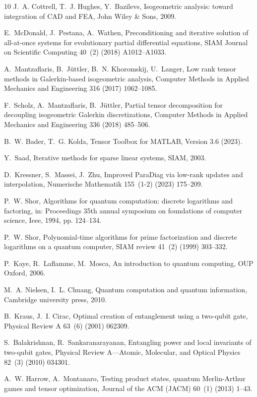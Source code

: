 \documentclass{article}
\numberwithin{equation}{section}
\theoremstyle{definition}
\begin{document}
\begin{thebibliography}{10}
J.~A. Cottrell, T.~J. Hughes, Y.~Bazilevs, {Isogeometric analysis: toward integration of CAD and FEA}, John Wiley \& Sons, 2009.

E.~McDonald, J.~Pestana, A.~Wathen, {Preconditioning and iterative solution of all-at-once systems for evolutionary partial differential equations}, SIAM Journal on Scientific Computing 40~(2) (2018) A1012--A1033.

A.~Mantzaflaris, B.~J{\"u}ttler, B.~N. Khoromskij, U.~Langer, {Low rank tensor methods in Galerkin-based isogeometric analysis}, Computer Methods in Applied Mechanics and Engineering 316 (2017) 1062--1085.

F.~Scholz, A.~Mantzaflaris, B.~J{\"u}ttler, {Partial tensor decomposition for decoupling isogeometric Galerkin discretizations}, Computer Methods in Applied Mechanics and Engineering 336 (2018) 485--506.

B.~W. Bader, T.~G. Kolda, {Tensor Toolbox for MATLAB, Version 3.6} (2023).

Y.~Saad, {Iterative methods for sparse linear systems}, SIAM, 2003.

D.~Kressner, S.~Massei, J.~Zhu, {Improved ParaDiag via low-rank updates and interpolation}, Numerische Mathematik 155~(1-2) (2023) 175--209.

P.~W. Shor, {Algorithms for quantum computation: discrete logarithms and factoring}, in: Proceedings 35th annual symposium on foundations of computer science, Ieee, 1994, pp. 124--134.

P.~W. Shor, {Polynomial-time algorithms for prime factorization and discrete logarithms on a quantum computer}, SIAM review 41~(2) (1999) 303--332.

P.~Kaye, R.~Laflamme, M.~Mosca, {An introduction to quantum computing}, OUP Oxford, 2006.

M.~A. Nielsen, I.~L. Chuang, {Quantum computation and quantum information}, Cambridge university press, 2010.

B.~Kraus, J.~I. Cirac, {Optimal creation of entanglement using a two-qubit gate}, Physical Review A 63~(6) (2001) 062309.

S.~Balakrishnan, R.~Sankaranarayanan, {Entangling power and local invariants of two-qubit gates}, Physical Review A---Atomic, Molecular, and Optical Physics 82~(3) (2010) 034301.

A.~W. Harrow, A.~Montanaro, {Testing product states, quantum Merlin-Arthur games and tensor optimization}, Journal of the ACM (JACM) 60~(1) (2013) 1--43.

\end{thebibliography}
\end{document}
